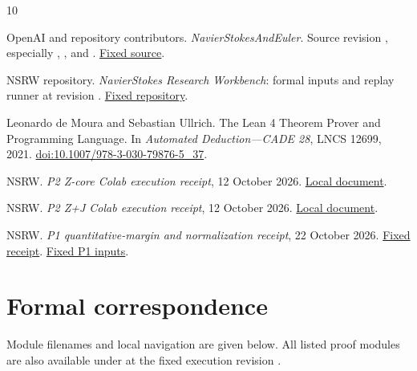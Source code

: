 \documentclass[11pt,a4paper]{article}
\begin{document}
\begin{thebibliography}{10}

OpenAI and repository contributors. \emph{NavierStokesAndEuler}. Source revision , especially , ,  and . \href{https://github.com/openai/NavierStokesAndEuler/tree/8937a8f4cbc7abaab5e9e97d1cc7f5d2319d9538}{Fixed source}.

NSRW repository. \emph{NavierStokes Research Workbench}: formal inputs and replay runner at revision . \href{https://github.com/flamehaven01/NavierStokes-Research-Workbench/tree/3a50b5f50b034319a469b9de68f556be70fff02c}{Fixed repository}.

Leonardo de Moura and Sebastian Ullrich. The Lean 4 Theorem Prover and Programming Language. In \emph{Automated Deduction---CADE 28}, LNCS 12699, 2021. \href{https://doi.org/10.1007/978-3-030-79876-5_37}{doi:10.1007/978-3-030-79876-5\_37}.

NSRW. \emph{P2 Z-core Colab execution receipt}, 12 October 2026. \href{https://github.com/flamehaven01/NavierStokes-Research-Workbench/blob/da646614c7022777b0bd095eaf0111dcf1157e8f/docs/stage_receipts/P2_Z_CORE_COLAB_2026-10-12.md}{Local document}.

NSRW. \emph{P2 Z+J Colab execution receipt}, 12 October 2026. \href{https://github.com/flamehaven01/NavierStokes-Research-Workbench/blob/da646614c7022777b0bd095eaf0111dcf1157e8f/docs/stage_receipts/P2_ZPLUS_J_COLAB_2026-10-12.md}{Local document}.

NSRW. \emph{P1 quantitative-margin and normalization receipt}, 22 October 2026. \href{https://github.com/flamehaven01/NavierStokes-Research-Workbench/blob/6de19be9c413a4f7e85db1697c59908f50887195/docs/stage_receipts/P1_QUANTITATIVE_MARGIN_COLAB_2026-10-22.md}{Fixed receipt}. \href{https://github.com/flamehaven01/NavierStokes-Research-Workbench/tree/7f29ebf0e2b894bf598144628230ae09df436c3d}{Fixed P1 inputs}.

\end{thebibliography}
\appendix
\section{Formal correspondence}

Module filenames and local navigation are given below. All listed proof modules are also available under  at the fixed execution revision \cite{ref2}.
\end{document}
